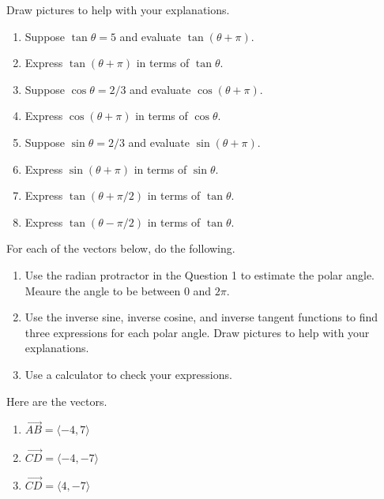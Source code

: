 \documentclass{ximera}
\begin{document}
\begin{question} \label{Q89DfegvVDE}
Draw pictures to help with your explanations.
\begin{enumerate}
\item Suppose $\tan \theta = 5$ and evaluate $\tan(\theta + \pi)$.

\item Express $\tan(\theta+\pi)$ in terms of $\tan \theta$.

\item Suppose $\cos \theta = 2/3$ and evaluate $\cos(\theta + \pi)$.

\item Express $\cos(\theta+\pi)$ in terms of $\cos \theta$.

\item Suppose $\sin \theta = 2/3$ and evaluate $\sin(\theta + \pi)$.

\item Express $\sin(\theta+\pi)$ in terms of $\sin \theta$.

\item Express $\tan(\theta+\pi/2)$ in terms of $\tan \theta$.

\item Express $\tan(\theta -\pi/2)$ in terms of $\tan \theta$.
\end{enumerate}
\end{question}



\begin{question}  \label{Q9DDFegbb}
For each of the vectors below, do the following.

\begin{enumerate}
\item Use the radian protractor in the Question 1 to estimate the polar angle. Meaure the angle to be between $0$ and $2\pi$.

\item Use the inverse sine, inverse cosine, and inverse tangent functions to find three expressions for each polar angle. Draw pictures to help with your explanations.

\item Use a calculator to check your expressions.

\end{enumerate}

Here are the vectors.

\begin{enumerate}
\item $\overrightarrow{AB} = \langle -4, 7 \rangle$

\item $\overrightarrow{CD} = \langle -4, -7 \rangle$

\item $\overrightarrow{CD} = \langle 4, -7 \rangle$

\end{enumerate}
\end{question}
\end{document}
